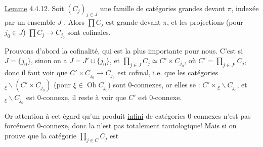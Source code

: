 \uline{Lemme} 4.4.12. Soit  $(C_j)_{j\in J}$ une famille de  catégories grandes devant $\pi$, indexée par un  ensemble $J$ . Alors $\prod C_j$ est grande devant $\pi$, et les projections (pour $j_0\in J$) $\prod C_j\longrightarrow C_{j_0}$ sont cofinales.

Prouvons d'abord la cofinalité, qui est la plus importante pour nous. C'est  si $J=\{j_0\}$, sinon on a $J=J'\cup\{j_0\}$, et $\prod_{j\in J}C_j\simeq C'\times C_{j_0}$, où $C'=\prod_{j\in J'}C_j$, donc il faut voir que $C'\times C_{j_0}\longrightarrow C_{j_0}$ est cofinal, i.e. que les catégories ${}_{\xi}\backslash(C'\times C_{j_0})$ (pour $\xi\in\operatorname{Ob}C_{j_0}$) sont $0$-connexes, or  elles se : $C'\times{}_{\xi}\backslash C_{j_0}$, et ${}_{\xi}\backslash C_{j_0}$ est $0$-connexe, il reste à voir que $C'$ est $0$-connexe.

Or  attention à cet égard qu'un produit \uline{infini} de catégories $0$-connexes n'est pas forcément $0$-connexe, donc  la   n'est pas totalement tautologique! Mais si on prouve que la catégorie $\prod_{j\in C}C_j$ est
